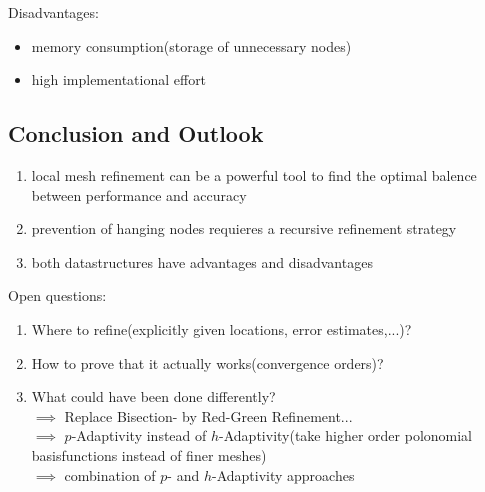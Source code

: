 Disadvantages:
\begin{itemize}
	\item memory consumption(storage of unnecessary nodes)
	\item high implementational effort
\end{itemize}

\subsection{Conclusion and Outlook}
\begin{enumerate}[label = \arabic* .]
	\item local mesh refinement can be a powerful tool to find the optimal balence between performance and accuracy
	\item prevention of hanging nodes requieres a recursive refinement strategy
	\item both datastructures have advantages and disadvantages  
\end{enumerate}
Open questions:
\begin{enumerate}[label = \arabic* .]
	\item Where to refine(explicitly given locations, error estimates,...)?
	\item How to prove that it actually works(convergence orders)?
	\item What could have been done differently?\\
	$\implies$ Replace Bisection- by Red-Green Refinement...\\
	$\implies$ $p$-Adaptivity instead of $h$-Adaptivity(take higher order polonomial basisfunctions instead of finer meshes)\\
	$\implies$ combination of $p$- and $h$-Adaptivity approaches
\end{enumerate}


